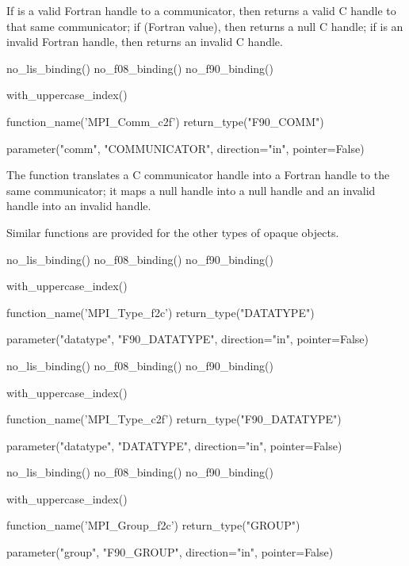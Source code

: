 If  is a valid Fortran handle to a communicator,
then  returns a valid C handle to that same
communicator;
if \mpicode{ = } (Fortran value), then
 returns a null C handle; if 
is an invalid Fortran handle, then 
returns an invalid C handle.

\begin{mpi-binding}
    no_lis_binding()
    no_f08_binding()
    no_f90_binding()

    with_uppercase_index()

    function_name('MPI_Comm_c2f')
    return_type("F90_COMM")

    parameter("comm", "COMMUNICATOR", direction="in", pointer=False)
\end{mpi-binding}

The function 
translates a C communicator handle into a Fortran handle to the same
communicator; it maps a null handle into a null handle and an invalid
handle into an invalid handle.

Similar functions are provided for the other types of opaque objects.

\bindingislisttrue
\begin{mpi-binding}
    no_lis_binding()
    no_f08_binding()
    no_f90_binding()

    with_uppercase_index()

    function_name('MPI_Type_f2c')
    return_type("DATATYPE")

    parameter("datatype", "F90_DATATYPE", direction="in", pointer=False)
\end{mpi-binding}

\begin{mpi-binding}
    no_lis_binding()
    no_f08_binding()
    no_f90_binding()

    with_uppercase_index()

    function_name('MPI_Type_c2f')
    return_type("F90_DATATYPE")

    parameter("datatype", "DATATYPE", direction="in", pointer=False)
\end{mpi-binding}

%

\begin{mpi-binding}
    no_lis_binding()
    no_f08_binding()
    no_f90_binding()

    with_uppercase_index()

    function_name('MPI_Group_f2c')
    return_type("GROUP")

    parameter("group", "F90_GROUP", direction="in", pointer=False)
\end{mpi-binding}

